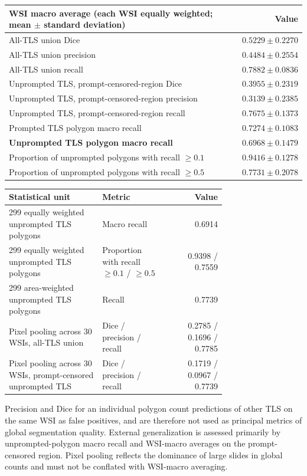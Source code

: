 \documentclass[11pt,letterpaper]{article}
\begin{document}
\begin{center}\small
\begin{tabular}{lr}
\toprule
WSI macro average (each WSI equally weighted; mean $\pm$ standard deviation) & Value\\ \midrule
All-TLS union Dice & $0.5229\pm0.2270$\\
All-TLS union precision & $0.4484\pm0.2554$\\
All-TLS union recall & $0.7882\pm0.0836$\\
Unprompted TLS, prompt-censored-region Dice & $0.3955\pm0.2319$\\
Unprompted TLS, prompt-censored-region precision & $0.3139\pm0.2385$\\
Unprompted TLS, prompt-censored-region recall & $0.7675\pm0.1373$\\
Prompted TLS polygon macro recall & $0.7274\pm0.1083$\\
\textbf{Unprompted TLS polygon macro recall} & \textbf{$0.6968\pm0.1479$}\\
Proportion of unprompted polygons with recall $\geq0.1$ & $0.9416\pm0.1278$\\
Proportion of unprompted polygons with recall $\geq0.5$ & $0.7731\pm0.2078$\\
\bottomrule
\end{tabular}
\end{center}

\begin{center}\small
\begin{tabular}{@{}p{0.43\linewidth}p{0.30\linewidth}r@{}}
\toprule
Statistical unit & Metric & Value\\ \midrule
299 equally weighted unprompted TLS polygons & Macro recall & 0.6914\\
299 equally weighted unprompted TLS polygons & Proportion with recall $\geq0.1$ / $\geq0.5$ & 0.9398 / 0.7559\\
299 area-weighted unprompted TLS polygons & Recall & 0.7739\\
Pixel pooling across 30 WSIs, all-TLS union & Dice / precision / recall & 0.2785 / 0.1696 / 0.7785\\
Pixel pooling across 30 WSIs, prompt-censored unprompted TLS & Dice / precision / recall & 0.1719 / 0.0967 / 0.7739\\
\bottomrule
\end{tabular}
\end{center}

Precision and Dice for an individual polygon count predictions of other TLS on the same WSI as false positives, and are therefore not used as principal metrics of global segmentation quality. External generalization is assessed primarily by unprompted-polygon macro recall and WSI-macro averages on the prompt-censored region. Pixel pooling reflects the dominance of large slides in global counts and must not be conflated with WSI-macro averaging.
\end{document}

